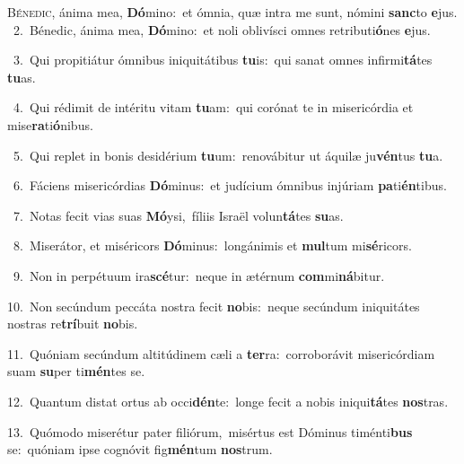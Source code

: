 \lettrine{\initial\textcolor{\initialcolor}{B}}{énedic,} ánima mea, \textbf{Dó}\-mino:~\star et ómnia, quæ intra me sunt, nómini \textbf{sanc}\-to \textbf{e}\-jus.\\
{\numbfont\textcolor{\numbcolor}{~2.}}~Bénedic, ánima mea, \textbf{Dó}\-mino:~\star et noli oblivísci omnes retributi\-\textbf{ó}\-nes \textbf{e}\-jus.\par
{\numbfont\textcolor{\numbcolor}{~3.}}~Qui propitiátur ómnibus iniquitátibus \textbf{tu}\-is:~\star qui sanat omnes infirmi\-\textbf{tá}\-tes \textbf{tu}\-as.\par
{\numbfont\textcolor{\numbcolor}{~4.}}~Qui rédimit de intéritu vitam \textbf{tu}\-am:~\star qui corónat te in misericórdia et mise\-\textbf{ra}\-ti\-\textbf{ó}\-nibus.\par
{\numbfont\textcolor{\numbcolor}{~5.}}~Qui replet in bonis desidérium \textbf{tu}\-um:~\star renovábitur ut áquilæ ju\-\textbf{vén}\-tus \textbf{tu}\-a.\par
{\numbfont\textcolor{\numbcolor}{~6.}}~Fáciens misericórdias \textbf{Dó}\-minus:~\star et judícium ómnibus injúriam \textbf{pa}\-ti\-\textbf{én}\-tibus.\par
{\numbfont\textcolor{\numbcolor}{~7.}}~Notas fecit vias suas \textbf{Mó}\-ysi,~\star fíliis Israël volun\-\textbf{tá}\-tes \textbf{su}\-as.\par
{\numbfont\textcolor{\numbcolor}{~8.}}~Miserátor, et miséricors \textbf{Dó}\-minus:~\star longánimis et \textbf{mul}\-tum mi\-\textbf{sé}\-ricors.\par
{\numbfont\textcolor{\numbcolor}{~9.}}~Non in perpétuum ira\-\textbf{scé}\-tur:~\star neque in ætérnum \textbf{com}\-mi\-\textbf{ná}\-bitur.\par
{\numbfont\textcolor{\numbcolor}{10.}}~Non secúndum peccáta nostra fecit \textbf{no}\-bis:~\star neque secúndum iniquitátes nostras re\-\textbf{trí}\-buit \textbf{no}\-bis.\par
{\numbfont\textcolor{\numbcolor}{11.}}~Quóniam secúndum altitúdinem cæli a \textbf{ter}\-ra:~\star corroborávit misericórdiam suam \textbf{su}\-per ti\-\textbf{mén}\-tes se.\par
{\numbfont\textcolor{\numbcolor}{12.}}~Quantum distat ortus ab occi\-\textbf{dén}\-te:~\star longe fecit a nobis iniqui\-\textbf{tá}\-tes \textbf{nos}\-tras.\par
{\numbfont\textcolor{\numbcolor}{13.}}~Quómodo miserétur pater filiórum,~\dagger misértus est Dóminus timénti\textbf{bus} se:~\star quóniam ipse cognóvit fig\-\textbf{mén}\-tum \textbf{nos}\-trum.\par
